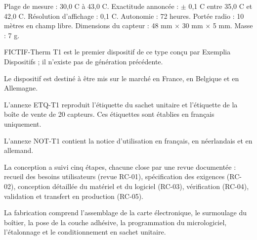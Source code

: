 \documentclass[11pt,a4paper]{article}
\begin{document}
{\small Plage de mesure : 30,0 \textdegree{}C à 43,0 \textdegree{}C. Exactitude annoncée : $\pm$ 0,1 \textdegree{}C entre 35,0 \textdegree{}C et 42,0 \textdegree{}C. Résolution d'affichage : 0,1 \textdegree{}C. Autonomie : 72 heures. Portée radio : 10 mètres en champ libre. Dimensions du capteur : 48 mm $\times$ 30 mm $\times$ 5 mm. Masse : 7 g.}\par

\par{}\par

{\small FICTIF-Therm T1 est le premier dispositif de ce type conçu par Exemplia Dispositifs ; il n'existe pas de génération précédente.}\par

\par{}\par

{\small Le dispositif est destiné à être mis sur le marché en France, en Belgique et en Allemagne.}\par

{\small L'annexe ETQ-T1 reproduit l'étiquette du sachet unitaire et l'étiquette de la boîte de vente de 20 capteurs. Ces étiquettes sont établies en français uniquement.}\par

{\small L'annexe NOT-T1 contient la notice d'utilisation en français, en néerlandais et en allemand.}\par

\par{}\par

\par{}\par

{\small La conception a suivi cinq étapes, chacune close par une revue documentée : recueil des besoins utilisateurs (revue RC-01), spécification des exigences (RC-02), conception détaillée du matériel et du logiciel (RC-03), vérification (RC-04), validation et transfert en production (RC-05).}\par

\par{}\par

{\small La fabrication comprend l'assemblage de la carte électronique, le surmoulage du boîtier, la pose de la couche adhésive, la programmation du micrologiciel, l'étalonnage et le conditionnement en sachet unitaire.}\par
\end{document}
